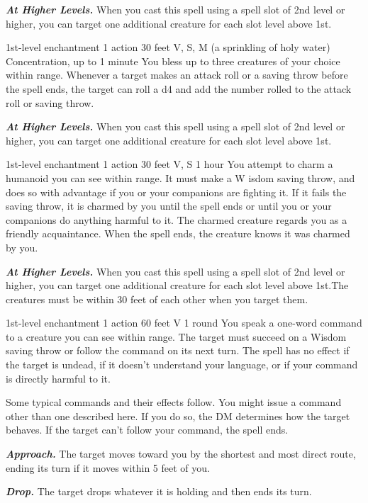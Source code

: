 \documentclass[10pt,twoside,twocolumn,openany]{book}
\newcommand\impact[1]{
	\textbf{\textit{#1}}
}
\begin{document}
\impact{At Higher Levels.} When you cast this spell using a spell slot of 2nd level or higher, you can target one additional creature for each slot level above 1st.

{1st-level enchantment}
{\color{action} 1 action}
{30 feet}
{V, S, M (a sprinkling of holy water)}
{{\color{concentration}Concentration}, up to 1 minute}
%
You bless up to three creatures of your choice within range. Whenever a target makes an attack roll or a saving throw before the spell ends, the target can roll a d4 and add the number rolled to the attack roll or saving throw.

\impact{At Higher Levels.} When you cast this spell using a spell slot of 2nd level or higher, you can target one additional creature for each slot level above 1st.

{1st-level enchantment}
{\color{action} 1 action}
{30 feet}
{V, S}
{1 hour}
%
You attempt to charm a humanoid you can see within range. It must make a W isdom saving throw, and does so with advantage if you or your companions are fighting it. If it fails the saving throw, it is charmed by you until the spell ends or until you or your companions do anything harmful to it. The charmed creature regards you as a friendly acquaintance. When the spell ends, the creature knows it was charmed by you.

\impact{At Higher Levels.} When you cast this spell using a spell slot of 2nd level or higher, you can target one additional creature for each slot level above 1st.The creatures must be within 30 feet of each other when you target them.

{1st-level enchantment}
{\color{action} 1 action}
{60 feet}
{V}
{1 round}
%
You speak a one-word command to a creature you can see within range. The target must succeed on a Wisdom saving throw or follow the command on its next turn. The spell has no effect if the target is undead, if it doesn't understand your language, or if your command is directly harmful to it.

Some typical commands and their effects follow. You might issue a command other than one described here. If you do so, the DM determines how the target behaves. If the target can't follow your command, the spell ends.

\impact{Approach.} The target moves toward you by the shortest and most direct route, ending its turn if it moves within 5 feet of you.

\impact{Drop.} The target drops whatever it is holding and then ends its turn.
\end{document}
